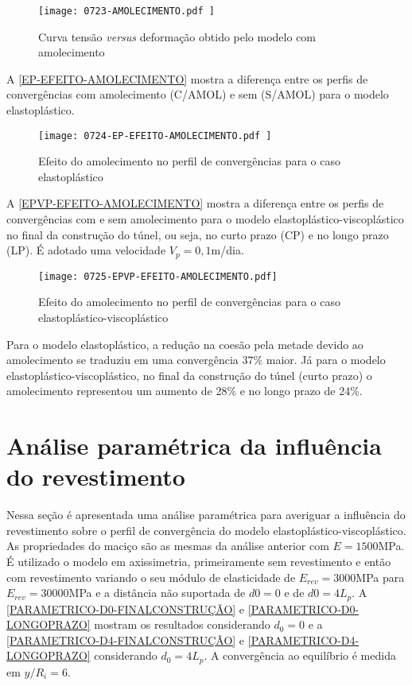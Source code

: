 \begin{figure}[H]
	\begin{center}
		\texttt{[image: 0723-AMOLECIMENTO.pdf
		]}
	\end{center}
	\caption{\label{AMOLECIMENTO}Curva tensão \textit{versus} deformação obtido pelo modelo com amolecimento}
\end{figure}

A \autoref{EP-EFEITO-AMOLECIMENTO} mostra a diferença entre os perfis de convergências com amolecimento (C/AMOL) e sem (S/AMOL) para o modelo elastoplástico.

\begin{figure}[H]
	\begin{center}
		\texttt{[image: 0724-EP-EFEITO-AMOLECIMENTO.pdf
		]}
	\end{center}
	\caption{\label{EP-EFEITO-AMOLECIMENTO}Efeito do amolecimento no perfil de convergências para o caso elastoplástico}
\end{figure}

A \autoref{EPVP-EFEITO-AMOLECIMENTO} mostra a diferença entre os perfis de convergências com e sem amolecimento para o modelo elastoplástico-viscoplástico no final da construção do túnel, ou seja, no curto prazo (CP) e no longo prazo (LP). É adotado uma velocidade $V_p=0,1$m/dia.

\begin{figure}[H]
	\begin{center}
		\texttt{[image: 0725-EPVP-EFEITO-AMOLECIMENTO.pdf]}
	\end{center}
	\caption{\label{EPVP-EFEITO-AMOLECIMENTO}Efeito do amolecimento no perfil de convergências para o caso elastoplástico-viscoplástico}
\end{figure}

Para o modelo elastoplástico, a redução na coesão pela metade devido ao amolecimento se traduziu em uma convergência 37\% maior. Já para o modelo elastoplástico-viscoplástico, no final da construção do túnel (curto prazo) o amolecimento representou um aumento de 28\% e no longo prazo de 24\%.


\section{Análise paramétrica da influência do revestimento}

Nessa seção é apresentada uma análise paramétrica para averiguar a influência do revestimento sobre o perfil de convergência do modelo elastoplástico-viscoplástico. As propriedades do maciço são as mesmas da análise anterior com $E=1500$MPa. É utilizado o modelo em axissimetria, primeiramente sem revestimento e então com revestimento variando o seu módulo de elasticidade de $E_{rev} = 3000$MPa para $E_{rev} = 30000$MPa e a distância não suportada de $d0 = 0$ e de $d0 = 4L_p$. A \autoref{PARAMETRICO-D0-FINALCONSTRUÇÃO} e \autoref{PARAMETRICO-D0-LONGOPRAZO} mostram os resultados considerando $d_0 = 0$ e a \autoref{PARAMETRICO-D4-FINALCONSTRUÇÃO} e \autoref{PARAMETRICO-D4-LONGOPRAZO} considerando $d_0=4L_p$. A convergência ao equilíbrio é medida em $y/R_i = 6$. 

